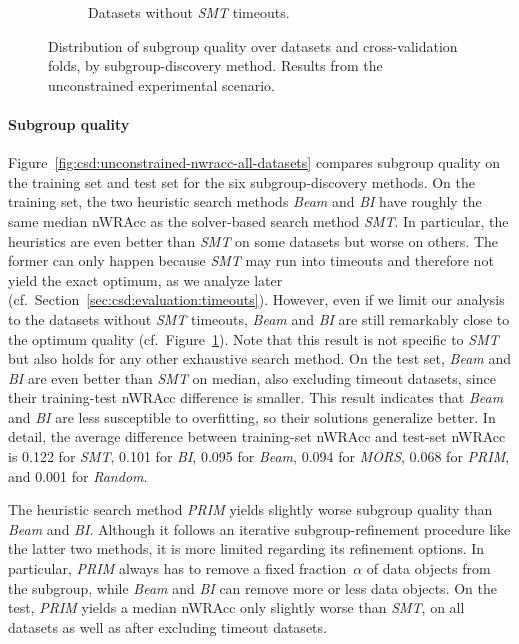 \documentclass{article}
\theoremstyle{definition}
\begin{document}
\begin{figure}[t]
\begin{subfigure}[t]{0.48\textwidth}
		\caption{Datasets without \emph{SMT} timeouts.}
		\label{fig:csd:unconstrained-nwracc-no-timeout-datasets}
	\end{subfigure}
	\caption{
		Distribution of subgroup quality over datasets and cross-validation folds, by subgroup-discovery method.
		Results from the unconstrained experimental scenario.
	}
	\label{fig:csd:unconstrained-nwracc}
\end{figure}

\paragraph{Subgroup quality}

Figure~\ref{fig:csd:unconstrained-nwracc-all-datasets} compares subgroup quality on the training set and test set for the six subgroup-discovery methods.
On the training set, the two heuristic search methods \emph{Beam} and \emph{BI} have roughly the same median nWRAcc as the solver-based search method \emph{SMT}.
In particular, the heuristics are even better than \emph{SMT} on some datasets but worse on others.
The former can only happen because \emph{SMT} may run into timeouts and therefore not yield the exact optimum, as we analyze later (cf.~Section~\ref{sec:csd:evaluation:timeouts}).
However, even if we limit our analysis to the datasets without \emph{SMT} timeouts, \emph{Beam} and \emph{BI} are still remarkably close to the optimum quality (cf.~Figure~\ref{fig:csd:unconstrained-nwracc-no-timeout-datasets}).
Note that this result is not specific to \emph{SMT} but also holds for any other exhaustive search method.
On the test set, \emph{Beam} and \emph{BI} are even better than \emph{SMT} on median, also excluding timeout datasets, since their training-test nWRAcc difference is smaller.
This result indicates that \emph{Beam} and \emph{BI} are less susceptible to overfitting, so their solutions generalize better.
In detail, the average difference between training-set nWRAcc and test-set nWRAcc is 0.122 for \emph{SMT}, 0.101 for \emph{BI}, 0.095 for \emph{Beam}, 0.094 for \emph{MORS}, 0.068 for \emph{PRIM}, and 0.001 for \emph{Random}.

The heuristic search method \emph{PRIM} yields slightly worse subgroup quality than \emph{Beam} and \emph{BI}.
Although it follows an iterative subgroup-refinement procedure like the latter two methods, it is more limited regarding its refinement options.
In particular, \emph{PRIM} always has to remove a fixed fraction~$\alpha$ of data objects from the subgroup, while \emph{Beam} and \emph{BI} can remove more or less data objects.
On the test, \emph{PRIM} yields a median nWRAcc only slightly worse than \emph{SMT}, on all datasets as well as after excluding timeout datasets.
\end{document}
